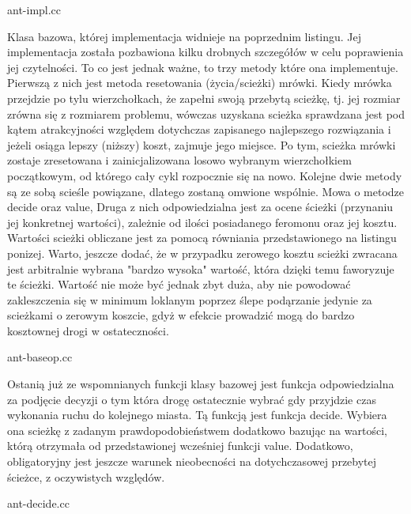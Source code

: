 \documentclass[polish,polish,a4paper]{article}
\begin{document}

{ant-impl.cc}

Klasa bazowa, której implementacja widnieje na poprzednim listingu. Jej implementacja została pozbawiona kilku drobnych szczegółów w celu poprawienia
jej czytelności. To co jest jednak ważne, to trzy metody które ona implementuje.
Pierwszą z nich jest metoda resetowania (życia/scieżki) mrówki. Kiedy mrówka przejdzie po tylu wierzchołkach, że zapełni swoją przebytą scieżkę, tj.
jej rozmiar zrówna się z rozmiarem problemu, wówczas uzyskana scieżka sprawdzana jest pod kątem atrakcyjności względem dotychczas zapisanego
najlepszego rozwiązania i jeżeli osiąga lepszy (niższy) koszt, zajmuje jego miejsce. Po tym, scieżka mrówki zostaje zresetowana i zainicjalizowana
losowo wybranym wierzchołkiem początkowym, od którego cały cykl rozpocznie się na nowo.
Kolejne dwie metody są ze sobą scieśle powiązane, dlatego zostaną omwione wspólnie. Mowa o metodze decide oraz value, Druga z nich odpowiedzialna
jest za ocene ścieżki (przynaniu jej konkretnej wartości), zależnie od ilości posiadanego feromonu oraz jej kosztu. Wartości scieżki obliczane jest 
za pomocą równiania przedstawionego na listingu ponizej. Warto, jeszcze dodać, że w przypadku zerowego kosztu scieżki zwracana jest arbitralnie wybrana
"bardzo wysoka" wartość, która dzięki temu faworyzuje te ścieżki. Wartość nie może być jednak zbyt duża, aby nie powodować zakleszczenia się w minimum
loklanym poprzez ślepe podąrzanie jedynie za scieżkami o zerowym koszcie, gdyż w efekcie prowadzić mogą do bardzo kosztownej drogi w ostateczności.


{ant-baseop.cc}

Ostanią już ze wspomnianych funkcji klasy bazowej jest funkcja odpowiedzialna za podjęcie decyzji o tym która drogę ostatecznie wybrać gdy przyjdzie
czas wykonania ruchu do kolejnego miasta. Tą funkcją jest funkcja decide. Wybiera ona scieżkę z zadanym prawdopodobieństwem dodatkowo bazując na wartości,
którą otrzymała od przedstawionej wcześniej funkcji value. Dodatkowo, obligatoryjny jest jeszcze warunek nieobecności na dotychczasowej przebytej ścieżce,
z oczywistych względów.


{ant-decide.cc}

\pagebreak
\end{document}
